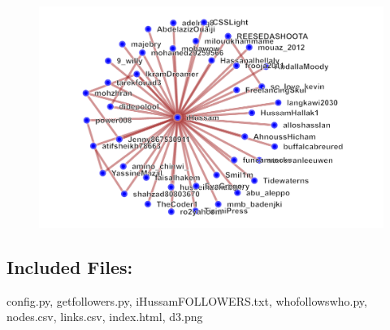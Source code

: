 \documentclass[a4paper, 11pt]{article}
\begin{document}
\begin{figure}[H]
\centering
\includegraphics[scale=0.5]{d3.png}
\end{figure}


\subsection*{Included Files:}
config.py, getfollowers.py, iHussamFOLLOWERS.txt, whofollowswho.py, nodes.csv, links.csv, index.html, d3.png
\end{document}
